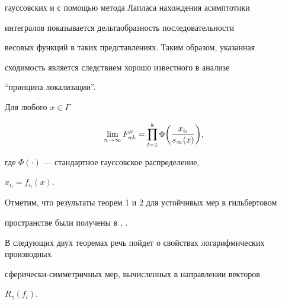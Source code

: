 гауссовских и с помощью метода Лапласа нахождения асимптотики


интегралов показывается дельтаобразность последовательности


весовых функций в таких представлениях. Таким образом, указанная


сходимость является следствием хорошо известного в анализе


``принципа локализации''.








\begin{thm}


Для любого $x\in\Gamma$


$$


\lim_{n\to\infty}F^\mu_{nk}


=\prod_{l=1}^k\Phi\bigg(\frac{x_{i_l}}{\s}\bigg),


$$


где $\Phi(\cdot)$ --- стандартное гауссовское распределение,


$x_{i_l}=f_{i_l}(x)$.


\end{thm}





Отметим, что результаты теорем 1 и 2 для устойчивых мер в гильбертовом 


пространстве были получены в \cite{Shats}, \cite{Kn}.





В следующих двух теоремах речь пойдет о свойствах логарифмических производных


сфе\-ри\-чес\-ки-симметричных мер, вычисленных в направлении векторов


$R_\gamma(f_i)$.








